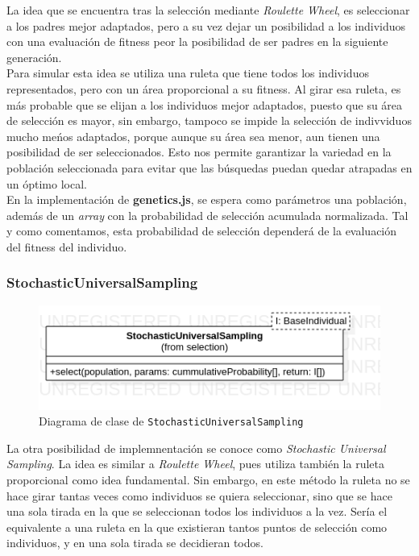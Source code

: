 La idea que se encuentra tras la selección mediante \textit{Roulette Wheel}, es seleccionar a los padres mejor adaptados, pero a su vez dejar un posibilidad a los individuos con una evaluación de fitness peor la posibilidad de ser padres en la siguiente generación. \\

Para simular esta idea se utiliza una ruleta que tiene todos los individuos representados, pero con un área proporcional a su fitness. Al girar esa ruleta, es más probable que se elijan a los individuos mejor adaptados, puesto que su área de selección es mayor, sin embargo, tampoco se impide la selección de indivviduos mucho meńos adaptados, porque aunque su área sea menor, aun tienen una posibilidad de ser seleccionados. Esto nos permite garantizar la variedad en la población seleccionada para evitar que las búsquedas puedan quedar atrapadas en un óptimo local. \\

En la implementación de \textbf{genetics.js}, se espera como parámetros una población, además de un \textit{array} con la probabilidad de selección acumulada normalizada. Tal y como comentamos, esta probabilidad de selección dependerá de la evaluación del fitness del individuo.

\subsubsection{StochasticUniversalSampling}

\begin{figure}[ht]
    \centering
    \includegraphics[scale=0.6]{mem/images/cap-4/4.2.5(Selection)/SUS.png}
    \caption{Diagrama de clase de \texttt{StochasticUniversalSampling}}
    \label{fig:generator-uml}
\end{figure}


La otra posibilidad de implemnentación se conoce como \textit{Stochastic Universal Sampling}. La idea es similar a \textit{Roulette Wheel}, pues utiliza también la ruleta proporcional como idea fundamental. Sin embargo, en este método la ruleta no se hace girar tantas veces como individuos se quiera seleccionar, sino que se hace una sola tirada en la que se seleccionan todos los individuos a la vez. Sería el equivalente a una ruleta en la que existieran tantos puntos de selección como individuos, y en una sola tirada se decidieran todos. \\

